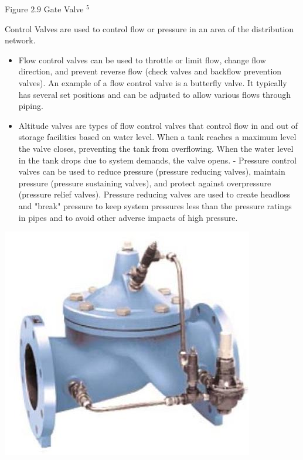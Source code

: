 \documentclass[10pt]{article}
\begin{document}
Figure $2.9$ Gate Valve ${ }^{5}$

Control Valves are used to control flow or pressure in an area of the distribution network.

\begin{itemize}
  \item Flow control valves can be used to throttle or limit flow, change flow direction, and prevent reverse flow (check valves and backflow prevention valves). An example of a flow control valve is a butterfly valve. It typically has several set positions and can be adjusted to allow various flows through piping.

  \item Altitude valves are types of flow control valves that control flow in and out of storage facilities based on water level. When a tank reaches a maximum level the valve closes, preventing the tank from overflowing. When the water level in the tank drops due to system demands, the valve opens. - Pressure control valves can be used to reduce pressure (pressure reducing valves), maintain pressure (pressure sustaining valves), and protect against overpressure (pressure relief valves). Pressure reducing valves are used to create headloss and "break" pressure to keep system pressures less than the pressure ratings in pipes and to avoid other adverse impacts of high pressure.

\end{itemize}
\includegraphics[max width=\textwidth]{PressureReducingValve}
\end{document}
